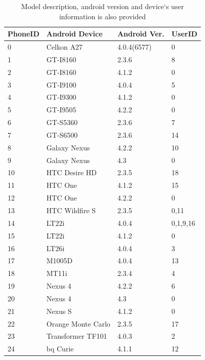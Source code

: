 \documentclass[a4paper,singleside,12pt]{report} %
\begin{document}
				\begin{table}[!htb]
				\centering
				\begin{tabular}{llll}
				\hline
				PhoneID & Android Device     & Android Ver. & UserID   \\ \hline
				0       & Celkon A27         & 4.0.4(6577)  & 0        \\
				1       & GT-I8160           & 2.3.6        & 8        \\
				2       & GT-I8160           & 4.1.2        & 0        \\
				3       & GT-I9100           & 4.0.4        & 5        \\
				4       & GT-I9300           & 4.1.2        & 0        \\
				5       & GT-I9505           & 4.2.2        & 0        \\
				6       & GT-S5360           & 2.3.6        & 7        \\
				7       & GT-S6500           & 2.3.6        & 14       \\
				8       & Galaxy Nexus       & 4.2.2        & 10       \\
				9       & Galaxy Nexus       & 4.3          & 0        \\
				10      & HTC Desire HD      & 2.3.5        & 18       \\
				11      & HTC One            & 4.1.2        & 15       \\
				12      & HTC One            & 4.2.2        & 0        \\
				13      & HTC Wildfire S     & 2.3.5        & 0,11     \\
				14      & LT22i              & 4.0.4        & 0,1,9,16 \\
				15      & LT22i              & 4.1.2        & 0        \\
				16      & LT26i              & 4.0.4        & 3        \\
				17      & M1005D             & 4.0.4        & 13       \\
				18      & MT11i              & 2.3.4        & 4        \\
				19      & Nexus 4            & 4.2.2        & 6        \\
				20      & Nexus 4            & 4.3          & 0        \\
				21      & Nexus S            & 4.1.2        & 0        \\
				22      & Orange Monte Carlo & 2.3.5        & 17       \\
				23      & Transformer TF101  & 4.0.3        & 2        \\
				24      & bq Curie           & 4.1.1        & 12  \\   \hline 
				\end{tabular}
				\caption[Correspondence between PhoneID and real device.] {Model description,  android version and device`s user information is also provided}
				\label{table3.3}
				\end{table}
\end{document}

